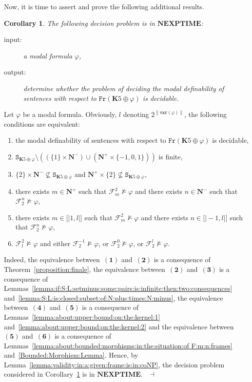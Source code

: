 \documentclass[draft]{article}
\newtheorem{corollary}{Corollary}
\newenvironment{proof}{{\bf Proof:}}{~$\dashv$\\}
\def\lsem{{\lbrack\mid}}
\def\rsem{{\mid\rbrack}}
\def\Fr{\mathtt{Fr}}
\def\NEXPTIME{\mathbf{NEXPTIME}}
\def\vvar{\mathtt{var}}
\def\K{\mathbf{K}}
\begin{document}
%
%
Now, it is time to assert and prove the following additional results.
%
%
\begin{corollary}\label{corollary:modal:definability:complexity}
%
%
The following decision problem is in $\NEXPTIME$:
%
%
\begin{description}
%
%
\item[input:] a modal formula $\varphi$,
%
%
\item[output:] determine whether the problem of deciding the modal definability of sentences with respect to $\Fr(\K5{\oplus}\varphi)$ is decidable.
%
%
\end{description}
%
%
\end{corollary}
%
%
\begin{proof}
%
%
Let $\varphi$ be a modal formula.
Obviously, $l$ denoting $2^{{\parallel}\vvar(\varphi){\parallel}}$, the following conditions are equivalent:
%
%
\begin{enumerate}
%
%
\item the modal definability of sentences with respect to $\Fr(\K5{\oplus}\varphi)$ is decidable,
%
%
\item $\mathtt{S}_{\K5{\oplus}\varphi}{\setminus}((\{1\}{\times}\mathbf{N}^{-}){\cup}(\mathbf{N}^{+}{\times}\{{-}1,0,1\}))$ is finite,
%
%
\item $\{2\}{\times}\mathbf{N}^{-}{\not\subseteq}\mathtt{S}_{\K5{\oplus}\varphi}$ and $\mathbf{N}^{+}{\times}\{2\}{\not\subseteq}\mathtt{S}_{\K5{\oplus}\varphi}$,
%
%
\item there exists $m{\in}\mathbf{N}^{+}$ such that ${\mathcal F}_{m}^{2}{\not\models}\varphi$ and there exists $n{\in}\mathbf{N}^{-}$ such that ${\mathcal F}_{2}^{n}{\not\models}\varphi$,
%
%
\item there exists $m{\in}\lsem1,l\rsem$ such that ${\mathcal F}_{m}^{2}{\not\models}\varphi$ and there exists $n{\in}\lsem{-}1,l\rsem$ such that ${\mathcal F}_{2}^{n}{\not\models}\varphi$,
%
%
\item ${\mathcal F}_{l}^{2}{\not\models}\varphi$ and either ${\mathcal F}_{2}^{{-}1}{\not\models}\varphi$, or ${\mathcal F}_{2}^{0}{\not\models}\varphi$, or ${\mathcal F}_{2}^{l}{\not\models}\varphi$.
%
%
\end{enumerate}
%
%
Indeed, the equivalence between~$\mathbf{(1)}$ and~$\mathbf{(2)}$ is a consequence of Theorem~\ref{proposition:finale}, the equivalence between~$\mathbf{(2)}$ and~$\mathbf{(3)}$ is a consequence of Lemmas~\ref{lemma:if:S:L:setminus:some:pairs:is:infinite:then:two:consequences} and~\ref{lemma:S:L:is:closed:subset:of:N:plus:times:N:minus}, the equivalence between~$\mathbf{(4)}$ and~$\mathbf{(5)}$ is a consequence of Lemmas~\ref{lemma:about:upper:bound:on:the:kernel:1} and~\ref{lemma:about:upper:bound:on:the:kernel:2} and the equivalence between~$\mathbf{(5)}$ and~$\mathbf{(6)}$ is a consequence of Lemmas~\ref{lemma:about:bounded:morphisms:in:the:situation:of F:m:n:frames} and~\ref{Bounded:Morphism:Lemma}.
Hence, by Lemma~\ref{lemma:validity:in:a:given:frame:is:in:coNP}, the decision problem considered in Corollary~\ref{corollary:modal:definability:complexity} is in $\NEXPTIME$.
%
%
\medskip
%
%
\end{proof}
\end{document}
